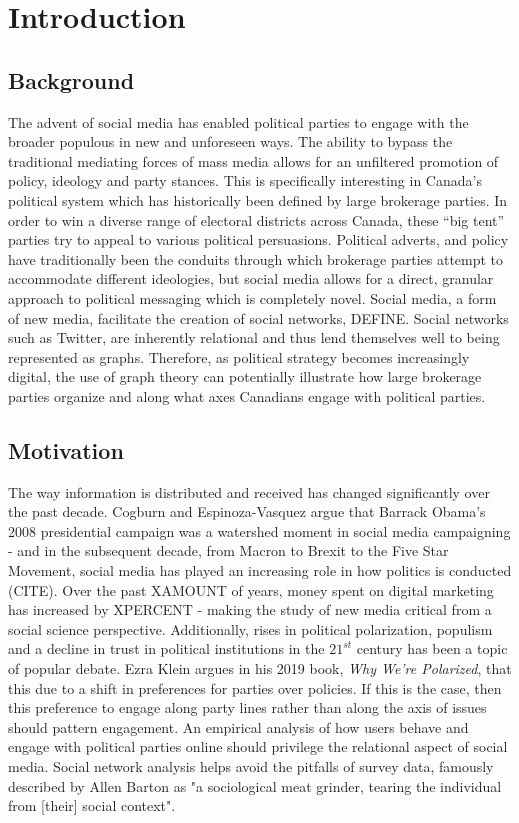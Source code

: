 \chapter{Introduction}

\section{Background}

The advent of social media has enabled political parties to engage with the broader populous in new and unforeseen ways. The ability to bypass the traditional mediating forces of mass media allows for an unfiltered promotion of policy, ideology and party stances. This is specifically interesting in Canada’s political system which has historically been defined by large brokerage parties. In order to win a diverse range of electoral districts across Canada, these “big tent” parties try to appeal to various political persuasions. Political adverts, and policy have traditionally been the conduits through which brokerage parties attempt to accommodate different ideologies, but social media allows for a direct, granular approach to political messaging which is completely novel. Social media, a form of new media, facilitate the creation of social networks, DEFINE. Social networks such as Twitter, are inherently relational and thus lend themselves well to being represented as graphs. Therefore, as political strategy becomes increasingly digital, the use of graph theory can potentially illustrate how large brokerage parties organize and along what axes Canadians engage with political parties.

\section{Motivation}

The way information is distributed and received has changed significantly over the past decade. Cogburn and Espinoza-Vasquez argue that Barrack Obama’s 2008 presidential campaign was a watershed moment in social media campaigning - and in the subsequent decade, from Macron to Brexit to the Five Star Movement, social media has played an increasing role in how politics is conducted (CITE). Over the past XAMOUNT of years, money spent on digital marketing has increased by XPERCENT - making the study of new media critical from a social science perspective. Additionally, rises in political polarization, populism and a decline in trust in political institutions in the $21^{st}$ century has been a topic of popular debate. Ezra Klein argues in his 2019 book, \emph{Why We're Polarized}, that this due to a shift in preferences for parties over policies. If this is the case, then this preference to engage along party lines rather than along the axis of issues should pattern engagement. An empirical analysis of how users behave and engage with political parties online should privilege the relational aspect of social media. Social network analysis helps avoid the pitfalls of survey data, famously described by Allen Barton as "a sociological meat grinder, tearing the individual from [their] social context"\cite{freeman2004development}.

